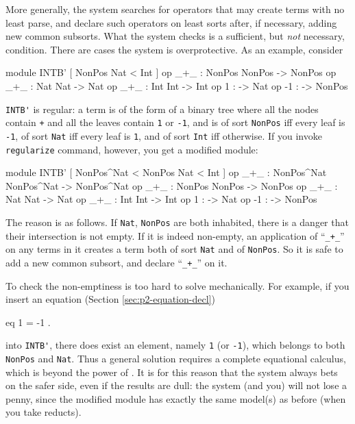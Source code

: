 \documentclass[a4paper]{memoir}
\begin{document}
More generally, the system searches for operators that may create
terms with no least parse, and declare such operators on least sorts
after, if necessary, adding new common subsorts. What the system
checks is a sufficient, but {\em not} necessary, condition. There are
cases the system is overprotective. As an example, consider
\begin{vvtm}
\begin{ccode}
  module INTB' {
    [ NonPos Nat < Int ]
    op _+_ : NonPos NonPos -> NonPos
    op _+_ : Nat Nat -> Nat
    op _+_ : Int Int -> Int
    op 1 : -> Nat
    op -1 : -> NonPos
  }
\end{ccode}
\end{vvtm}
\label{exs:intb'}
\verb|INTB'| is regular: a term is of the form of a binary tree where
all the nodes contain \verb|+| and all the leaves contain \verb|1| or
\verb|-1|, and is of sort \verb|NonPos| iff every leaf is \verb|-1|,
of sort \verb|Nat| iff every leaf is \verb|1|, and of sort \verb|Int|
iff otherwise. If you invoke \verb|regularize| command, however, you get
a modified module:
\begin{vvtm}
\begin{ccode}
  module INTB' {
    [ NonPos^Nat < NonPos Nat < Int ]
    op _+_ : NonPos^Nat NonPos^Nat -> NonPos^Nat
    op _+_ : NonPos NonPos -> NonPos
    op _+_ : Nat Nat -> Nat
    op _+_ : Int Int -> Int
    op 1 : -> Nat
    op -1 : -> NonPos
  }
\end{ccode}
\end{vvtm}
The reason is as follows. If \verb|Nat|, \verb|NonPos| are both
inhabited, there is a danger that their intersection is not
empty. If it is indeed non-empty,
an application of ``\verb|_+_|'' on any terms in it
creates a term both of sort
\verb|Nat| and of \verb|NonPos|. So it is safe to add a new common
subsort, and declare ``\verb|_+_|'' on it.

To check the non-emptiness is too hard to solve mechanically.
For example, if you insert an equation (Section \ref{sec:p2-equation-decl})
\begin{vvtm}
\begin{ccode}
  eq 1 = -1 .
\end{ccode}
\end{vvtm}
into \verb|INTB'|, there does exist an element, namely \verb|1|
(or \verb|-1|), which belongs to both \verb|NonPos| and \verb|Nat|.
Thus a general solution requires a complete equational calculus,
which is beyond the power of \cafeobj. It is for this reason that
the system always bets on the safer side, even if the results are dull:
the system (and you) will not lose a penny, since the modified
module has exactly the same model(s) as before (when you take reducts).
\end{document}
